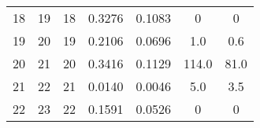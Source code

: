 \begin{table}
\begin{adjustbox}{width=0.95\textwidth,center=\textwidth}
\begin{tabular}{ccccccc}
18                                                        & 19                                                          & 18                                                  & 0.3276                                                                    & 0.1083                                                                    & 0                                                                           & 0                                                                                \\
19                                                        & 20                                                          & 19                                                  & 0.2106                                                                    & 0.0696                                                                    & 1.0                                                                         & 0.6                                                                              \\
20                                                        & 21                                                          & 20                                                  & 0.3416                                                                    & 0.1129                                                                    & 114.0                                                                       & 81.0                                                                             \\
21                                                        & 22                                                          & 21                                                  & 0.0140                                                                    & 0.0046                                                                    & 5.0                                                                         & 3.5                                                                              \\
22                                                        & 23                                                          & 22                                                  & 0.1591                                                                    & 0.0526                                                                    & 0                                                                           & 0                                                                                \\

\end{tabular}
\end{adjustbox}
\end{table}
